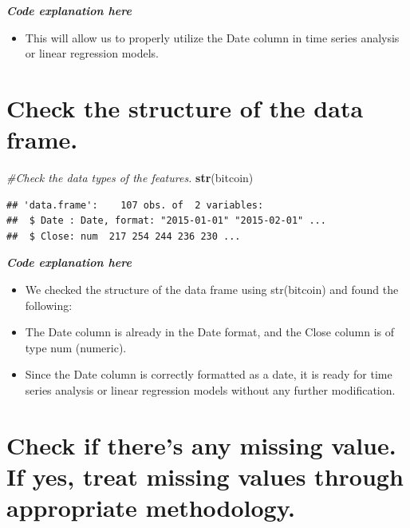 \documentclass[
]{book}
\newenvironment{Shaded}{\begin{snugshade}}{\end{snugshade}}
\newcommand{\CommentTok}[1]{\textcolor[rgb]{0.56,0.35,0.01}{\textit{#1}}}
\newcommand{\FunctionTok}[1]{\textcolor[rgb]{0.13,0.29,0.53}{\textbf{#1}}}
\newcommand{\NormalTok}[1]{#1}
\providecommand{\tightlist}{%
  \setlength{\itemsep}{0pt}\setlength{\parskip}{0pt}}
\begin{document}
\emph{\textbf{Code explanation here}}

\begin{itemize}
\tightlist
\item
  This will allow us to properly utilize the Date column in time series analysis or linear regression models.
\end{itemize}

\section*{Check the structure of the data frame.}\label{check-the-structure-of-the-data-frame.}

\begin{Shaded}
\begin{Highlighting}[]
\CommentTok{\#Check the data types of the features.}
\FunctionTok{str}\NormalTok{(bitcoin)}
\end{Highlighting}
\end{Shaded}

\begin{verbatim}
## 'data.frame':    107 obs. of  2 variables:
##  $ Date : Date, format: "2015-01-01" "2015-02-01" ...
##  $ Close: num  217 254 244 236 230 ...
\end{verbatim}

\emph{\textbf{Code explanation here}}

\begin{itemize}
\tightlist
\item
  We checked the structure of the data frame using str(bitcoin) and found the following:
\item
  The Date column is already in the Date format, and the Close column is of type num (numeric).
\item
  Since the Date column is correctly formatted as a date, it is ready for time series analysis or linear regression models without any further modification.
\end{itemize}

\section*{Check if there's any missing value. If yes, treat missing values through appropriate methodology.}\label{check-if-theres-any-missing-value.-if-yes-treat-missing-values-through-appropriate-methodology.}
\end{document}
